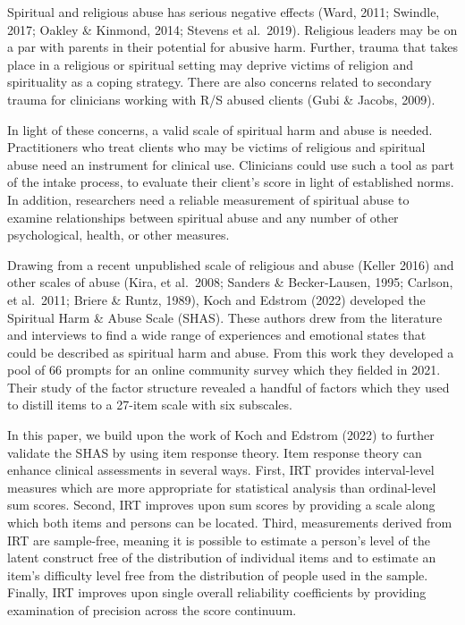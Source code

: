 \documentclass[
  letterpaper,
]{article}
\begin{document}
Spiritual and religious abuse has serious negative effects (Ward, 2011;
Swindle, 2017; Oakley \& Kinmond, 2014; Stevens et al.~2019). Religious
leaders may be on a par with parents in their potential for abusive
harm. Further, trauma that takes place in a religious or spiritual
setting may deprive victims of religion and spirituality as a coping
strategy. There are also concerns related to secondary trauma for
clinicians working with R/S abused clients (Gubi \& Jacobs, 2009).

In light of these concerns, a valid scale of spiritual harm and abuse is
needed. Practitioners who treat clients who may be victims of religious
and spiritual abuse need an instrument for clinical use. Clinicians
could use such a tool as part of the intake process, to evaluate their
client's score in light of established norms. In addition, researchers
need a reliable measurement of spiritual abuse to examine relationships
between spiritual abuse and any number of other psychological, health,
or other measures.

Drawing from a recent unpublished scale of religious and abuse (Keller
2016) and other scales of abuse (Kira, et al.~2008; Sanders \&
Becker-Lausen, 1995; Carlson, et al.~2011; Briere \& Runtz, 1989), Koch
and Edstrom (2022) developed the Spiritual Harm \& Abuse Scale (SHAS).
These authors drew from the literature and interviews to find a wide
range of experiences and emotional states that could be described as
spiritual harm and abuse. From this work they developed a pool of 66
prompts for an online community survey which they fielded in 2021. Their
study of the factor structure revealed a handful of factors which they
used to distill items to a 27-item scale with six subscales.

In this paper, we build upon the work of Koch and Edstrom (2022) to
further validate the SHAS by using item response theory. Item response
theory can enhance clinical assessments in several ways. First, IRT
provides interval-level measures which are more appropriate for
statistical analysis than ordinal-level sum scores. Second, IRT improves
upon sum scores by providing a scale along which both items and persons
can be located. Third, measurements derived from IRT are sample-free,
meaning it is possible to estimate a person's level of the latent
construct free of the distribution of individual items and to estimate
an item's difficulty level free from the distribution of people used in
the sample. Finally, IRT improves upon single overall reliability
coefficients by providing examination of precision across the score
continuum.
\end{document}
